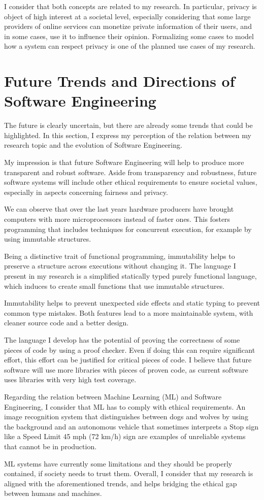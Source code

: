 \documentclass[11pt]{article}
\begin{document}
    I consider that both concepts are related to my research.
    In particular, privacy is object of high interest at a societal level, especially considering that some large providers of online services can monetize private information of their users, and in some cases, use it to influence their opinion.
    Formalizing some cases to model how a system can respect privacy is one of the planned use cases of my research.


    \section{Future Trends and Directions of Software Engineering}

    The future is clearly uncertain, but there are already some trends that could be highlighted.
    In this section, I express my perception of the relation between my research topic and the evolution of Software Engineering.

    My impression is that future Software Engineering will help to produce more transparent and robust software.
    Aside from transparency and robustness, future software systems will include other ethical requirements to ensure societal values, especially in aspects concerning fairness and privacy.

    We can observe that over the last years hardware producers have brought computers with more microprocessors instead of faster ones.
    This fosters programming that includes techniques for concurrent execution, for example by using immutable structures.

    Being a distinctive trait of functional programming, immutability helps to preserve a structure across executions without changing it.
    The language I present in my research is a simplified statically typed purely functional language, which induces to create small functions that use immutable structures.

    Immutability helps to prevent unexpected side effects and static typing to prevent common type mistakes.
    Both features lead to a more maintainable system, with cleaner source code and a better design.

    The language I develop has the potential of proving the correctness of some pieces of code by using a proof checker.
    Even if doing this can require significant effort, this effort can be justified for critical pieces of code.
    I believe that future software will use more libraries with pieces of proven code, as current software uses libraries with very high test coverage.

    Regarding the relation between Machine Learning (ML) and Software Engineering, I consider that ML has to comply with ethical requirements.
    An image recognition system that distinguishes between dogs and wolves by using the background and an autonomous vehicle that sometimes interprets a Stop sign like a Speed Limit 45 mph (72 km/h) sign are examples of unreliable systems that cannot be in production.

    ML systems have currently some limitations and they should be properly contained, if society needs to trust them.
    Overall, I consider that my research is aligned with the aforementioned trends, and helps bridging the ethical gap between humans and machines.
\end{document}
